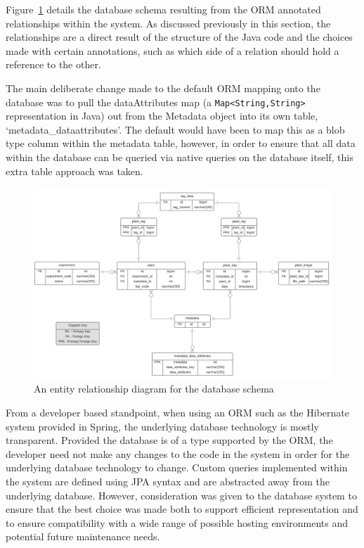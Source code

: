 Figure~\ref{fig:dbSchema} details the database schema resulting from the ORM annotated relationships within the system. As discussed previously in this section, the relationships are a direct result of the structure of the Java code and the choices made with certain annotations, such as which side of a relation should hold a reference to the other.

 The main deliberate change made to the default ORM mapping onto the database was to pull the dataAttributes map (a \texttt{Map<String,String>} representation in Java) out from the Metadata object into its own table, `metadata\_dataattributes'. The default would have been to map this as a blob type column within the metadata table, however, in order to ensure that all data within the database can be queried via native queries on the database itself, this extra table approach was taken.


\begin{figure}[H]
    \centering
    \includegraphics[width=\textwidth]{images/design/dbSchema}
    \caption{An entity relationship diagram for the database schema}
    \label{fig:dbSchema}
\end{figure}

From a developer based standpoint, when using an ORM such as the Hibernate system provided in Spring, the underlying database technology is mostly transparent. Provided the database is of a type supported by the ORM, the developer need not make any changes to the code in the system in order for the underlying database technology to change. Custom queries implemented within the system are defined using JPA syntax and are abstracted away from the underlying database. However, consideration was given to the database system to ensure that the best choice was made both to support efficient representation and to ensure compatibility with a wide range of possible hosting environments and potential future maintenance needs.

